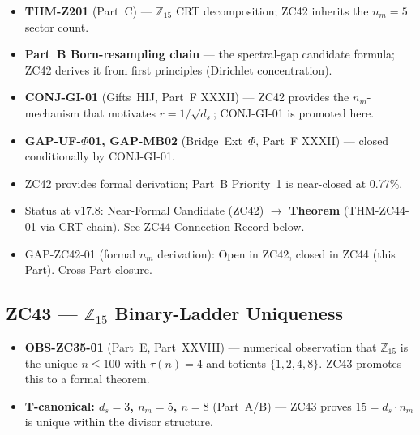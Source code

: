 \documentclass[12pt, a4paper]{article}
\begin{document}
\begin{inheritbox}
\begin{itemize}[leftmargin=*, noitemsep]
\item \textbf{THM-Z201} (Part~C) --- $\mathbb{Z}_{15}$ CRT
  decomposition; ZC42 inherits the $n_m = 5$ sector count.
\item \textbf{Part~B Born-resampling chain} --- the
  spectral-gap candidate formula; ZC42 derives it from first
  principles (Dirichlet concentration).
\item \textbf{CONJ-GI-01} (Gifts~HIJ, Part~F XXXII) ---
  ZC42 provides the $n_m$-mechanism that motivates
  $r = 1/\sqrt{d_s}$; CONJ-GI-01 is promoted here.
\item \textbf{GAP-UF-$\Phi$01, GAP-MB02} (Bridge~Ext~$\Phi$,
  Part~F XXXII) --- closed conditionally by CONJ-GI-01.
\end{itemize}
\end{inheritbox}

\begin{correctionbox}
\begin{itemize}[leftmargin=*, noitemsep]
\item {}
  ZC42 provides formal derivation; Part~B Priority~1 is
  near-closed at 0.77\%.
\item {}
  Status at v17.8: Near-Formal Candidate (ZC42)
  $\to$ \textbf{Theorem} (THM-ZC44-01 via CRT chain).
  See ZC44 Connection Record below.
\item {}
  GAP-ZC42-01 (formal $n_m$ derivation): Open in ZC42,
  closed in ZC44 (this Part). Cross-Part closure.
\end{itemize}
\end{correctionbox}

\subsection{ZC43 --- $\mathbb{Z}_{15}$ Binary-Ladder Uniqueness}

\begin{inheritbox}
\begin{itemize}[leftmargin=*, noitemsep]
\item \textbf{OBS-ZC35-01} (Part~E, Part~XXVIII) ---
  numerical observation that $\mathbb{Z}_{15}$ is the unique
  $n \le 100$ with $\tau(n) = 4$ and totients $\{1,2,4,8\}$.
  ZC43 promotes this to a formal theorem.
\item \textbf{T-canonical: $d_s = 3$, $n_m = 5$, $n = 8$}
  (Part~A/B) --- ZC43 proves $15 = d_s \cdot n_m$ is unique
  within the divisor structure.
\end{itemize}
\end{inheritbox}
\end{document}
